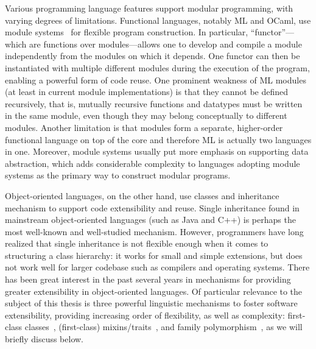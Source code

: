 Various programming language features support modular programming, with varying
degrees of limitations. Functional languages, notably ML and OCaml, use module
systems~\citep{MacQueen_1984} for flexible program construction. In particular,
``functor''---which are functions over modules---allows
one to develop and compile a module independently from the modules on which it
depends. One functor can then be instantiated with multiple different modules
during the execution of the program, enabling a powerful form of code reuse. One
prominent weakness of ML modules (at least in current module implementations) is
that they cannot be defined recursively, that is, mutually recursive functions
and datatypes must be written in the same module, even though they may belong
conceptually to different modules. Another limitation is that modules form a
separate, higher-order functional language on top of the core and therefore ML
is actually two languages in one. Moreover, module systems usually put more
emphasis on supporting data abstraction, which adds considerable complexity to
languages adopting module systems as the primary way to construct modular
programs.

Object-oriented languages, on the other hand, use classes and inheritance
mechanism to support code extensibility and reuse. Single inheritance found in
mainstream object-oriented languages (such as Java and C++) is perhaps the most
well-known and well-studied mechanism. However, programmers have long realized
that single inheritance is not flexible enough when it comes to structuring a
class hierarchy: it works for small and simple extensions, but does not work
well for larger codebase such as compilers and operating systems. There
has been great interest in the past several years in mechanisms for providing
greater extensibility in object-oriented languages. Of particular relevance to
the subject of this thesis is three powerful linguistic mechanisms to foster software
extensibility, providing increasing order of flexibility, as well as complexity:
first-class classes~\citep{DBLP:conf/oopsla/TakikawaSDTF12}, (first-class)
mixins/traits~\citep{bracha1990mixin, scharli2003traits}, and family
polymorphism~\citep{Ernst_2001}, as we will briefly discuss below.


